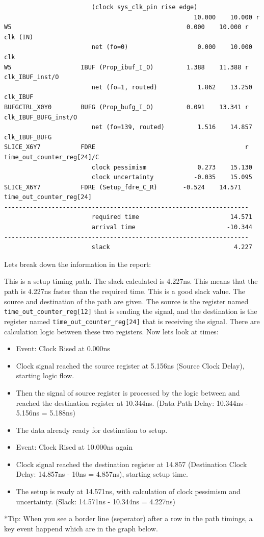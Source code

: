 \documentclass{report}
\newenvironment{narrowmargins}{
    \begin{adjustwidth}{-0.75in}{0.25in} %
}{
    \end{adjustwidth}
}
\begin{document}
\begin{narrowmargins}
\begin{verbatim}
                        (clock sys_clk_pin rise edge)
                                                    10.000    10.000 r  
W5                                                0.000    10.000 r  clk (IN)
                        net (fo=0)                   0.000    10.000    clk
W5                   IBUF (Prop_ibuf_I_O)         1.388    11.388 r  clk_IBUF_inst/O
                        net (fo=1, routed)           1.862    13.250    clk_IBUF
BUFGCTRL_X0Y0        BUFG (Prop_bufg_I_O)         0.091    13.341 r  clk_IBUF_BUFG_inst/O
                        net (fo=139, routed)         1.516    14.857    clk_IBUF_BUFG
SLICE_X6Y7           FDRE                                         r  time_out_counter_reg[24]/C
                        clock pessimism              0.273    15.130    
                        clock uncertainty           -0.035    15.095    
SLICE_X6Y7           FDRE (Setup_fdre_C_R)       -0.524    14.571    time_out_counter_reg[24]
-------------------------------------------------------------------
                        required time                         14.571    
                        arrival time                         -10.344    
-------------------------------------------------------------------
                        slack                                  4.227  
\end{verbatim}
\end{narrowmargins}
Lets break down the information in the report:

This is a setup timing path. The slack calculated is 4.227ns. This means that the path is 4.227ns faster than the required time. This is a good slack value.
The source and destination of the path are given. The source is the register named \texttt{time\_out\_counter\_reg[12]} that is sending the signal, and the destination is the register named \texttt{time\_out\_counter\_reg[24]} that is receiving the signal.
There are calculation logic between these two registers. Now lets look at times:
\begin{itemize}
    \item Event: Clock Rised at 0.000ns
    \item Clock signal reached the source register at 5.156ns (Source Clock Delay), starting logic flow.
    \item Then the signal of source register is processed by the logic between and reached the destination register at 10.344ns. (Data Path Delay: 10.344ns - 5.156ns = 5.188ns)
    \item The data already ready for destination to setup.
    \item Event: Clock Rised at 10.000ns again
    \item Clock signal reached the destination register at 14.857 (Destination Clock Delay: 14.857ns - 10ns = 4.857ns), starting setup time.
    \item The setup is ready at 14.571ns, with calculation of clock pessimism and uncertainty. (Slack: 14.571ns - 10.344ns = 4.227ns)
\end{itemize}
*Tip: When you see a border line (seperator) after a row in the path timings, a key event happend which are in the graph below. 
\end{document}
